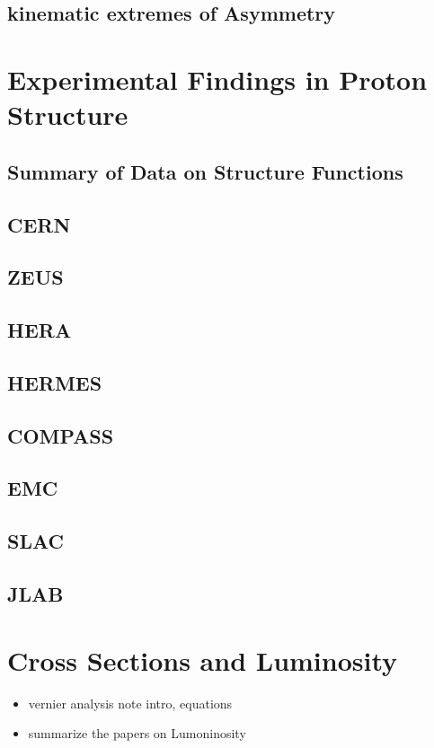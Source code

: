 \subsection{ kinematic extremes of Asymmetry}

\clearpage
\section{Experimental Findings in Proton Structure}
\subsection{Summary of Data on Structure Functions}
\subsection{CERN}
\subsection{ZEUS}
\subsection{HERA}
\subsection{HERMES}
\subsection{COMPASS}
\subsection{EMC}
\subsection{SLAC}
\subsection{JLAB}

\clearpage
\section{Cross Sections and Luminosity}
\begin{itemize}
		\item vernier analysis note intro, equations
		\item summarize the papers on Lumoninosity
\end{itemize}

\clearpage
